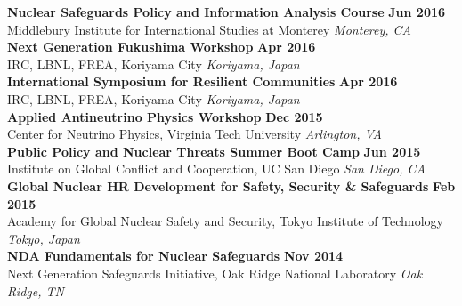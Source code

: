 \textbf{Nuclear Safeguards Policy and Information Analysis Course} \hfill \textbf{Jun 2016}\\
{\small{Middlebury Institute for International Studies at Monterey}} \hfill \textsl{Monterey, CA}\\[-3.5ex]

\textbf{Next Generation Fukushima Workshop} \hfill \textbf{Apr 2016}\\
{\small{IRC, LBNL, FREA, Koriyama City}} \hfill \textsl{Koriyama, Japan}\\[-3.5ex]

\textbf{International Symposium for Resilient Communities} \hfill \textbf{Apr 2016}\\
{\small{IRC, LBNL, FREA, Koriyama City}} \hfill \textsl{Koriyama, Japan}\\[-3.5ex]

\textbf{Applied Antineutrino Physics Workshop} \hfill \textbf{Dec 2015}\\
{\small{Center for Neutrino Physics, Virginia Tech University}} \hfill \textsl{Arlington, VA}\\[-3.5ex]

\textbf{Public Policy and Nuclear Threats Summer Boot Camp} \hfill \textbf{Jun 2015}\\
{\small{Institute on Global Conflict and Cooperation, UC San Diego}} \hfill \textsl{San Diego, CA}\\[-3.5ex]

\textbf{Global Nuclear HR Development for Safety, Security \& Safeguards} \hfill \textbf{Feb 2015}\\
{\small{Academy for Global Nuclear Safety and Security, Tokyo Institute of Technology}}  \hfill \textsl{Tokyo, Japan}\\[-3.5ex]

\textbf{NDA Fundamentals for Nuclear Safeguards} \hfill \textbf{Nov 2014}\\
{\small{Next Generation Safeguards Initiative, Oak Ridge National Laboratory}} \hfill  \textsl{Oak Ridge, TN}

%
